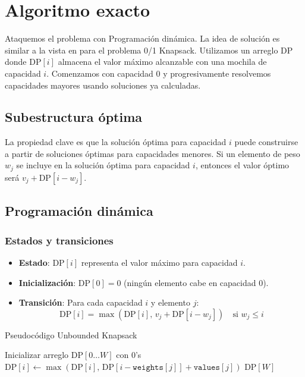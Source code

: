 \documentclass{report}
\begin{document}
\section{Algoritmo exacto}

Ataquemos el problema con Programación dinámica. La idea de solución es similar a la vista en \cite{CLRS2009} para el problema 0/1 Knapsack.
Utilizamos un arreglo $\text{DP}$ donde $\text{DP}[i]$ almacena el valor máximo alcanzable con una mochila de capacidad $i$. Comenzamos con capacidad 0 y progresivamente resolvemos capacidades mayores usando soluciones ya calculadas.

\subsection*{Subestructura óptima}
La propiedad clave es que la solución óptima para capacidad $i$ puede construirse a partir de soluciones óptimas para capacidades menores. Si un elemento de peso $w_j$ se incluye en la solución óptima para capacidad $i$, entonces el valor óptimo será $v_j + \text{DP}[i - w_j]$.

\subsection{Programación dinámica}
\subsubsection*{Estados y transiciones}
\begin{itemize}
    \item \textbf{Estado}: $\text{DP}[i]$ representa el valor máximo para capacidad $i$.
    \item \textbf{Inicialización}: $\text{DP}[0] = 0$ (ningún elemento cabe en capacidad 0).
    \item \textbf{Transición}: Para cada capacidad $i$ y elemento $j$:
        \[
        \text{DP}[i] = \max\left(\text{DP}[i],\, v_j + \text{DP}[i - w_j]\right) \quad \text{si } w_j \leq i
        \]
\end{itemize}

\begin{algorithm}[H]
	\caption{Pseudocódigo Unbounded Knapsack}
    \State Inicializar arreglo $\text{DP}[0 \dots W]$ con 0's
                \State $\text{DP}[i] \gets \max(\text{DP}[i],\, \text{DP}[i - \texttt{weights}[j]] + \texttt{values}[j])$
            \EndIf
        \EndFor
    \EndFor
    \State \Return $\text{DP}[W]$
\EndProcedure
\end{algorithm}
\end{document}
